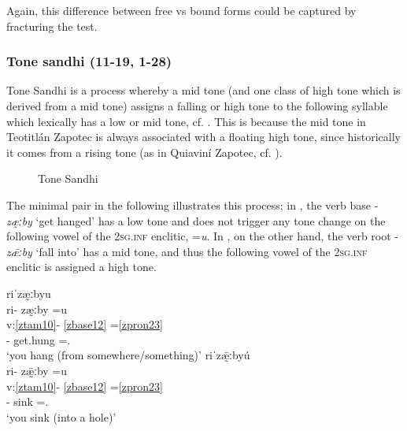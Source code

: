 \documentclass[output=paper]{langscibook}
\begin{document}
Again, this difference between free vs bound forms could be captured by fracturing the test.

\subsubsection{Tone sandhi (11-19, 1-28)}\label{bkm:Ref90470608}

Tone Sandhi is a process whereby a mid tone (and one class of high tone which is derived from a mid tone) assigns a falling or high tone to the following syllable which lexically has a low or mid tone, cf. . This is because the mid tone in Teotitlán Zapotec is always associated with a floating high tone, since historically it comes from a rising tone (as in Quiaviní Zapotec, cf. \citealt{Uchihara2016}).

\begin{figure}
    \caption{Tone Sandhi}
    \label{fig:zapotec-sandhi}
\end{figure}

The minimal pair in the following illustrates this process; in , the verb base -\textit{zæ̰ːby} `get hanged' has a low tone and does not trigger any tone change on the following vowel of the \textsc{2sg.inf} enclitic, =\textit{u}. In , on the other hand, the verb root -\textit{zǣːby} `fall into' has a mid tone, and thus the following vowel of the \textsc{2sg.inf} enclitic is assigned a high tone.

\ea\label{bkm:Ref82612849} 
    \ea\label{ex:key:zap:84a}
    {riˈzæ̰ːbyu} \\
    \glll ri- zæ̰ːby =u \\ 
    v:\ref{ztam10}- \ref{zbase12} =\ref{zpron23} \\
    \Hab{}- get.hung =\Second\Sg{}.\Inf{}\\
    \glt `you hang (from somewhere/something)' 
    \ex\label{ex:key:zap:84b}
    {riˈzǣ̰ːbyú}\\
    \glll ri- zǣ̰ːby =u \\ 
    v:\ref{ztam10}- \ref{zbase12} =\ref{zpron23}\\
    \Hab{}- sink =\Second\Sg{}.\Inf{} \\
    \glt `you sink (into a hole)'
    \z
\z 
\end{document}
